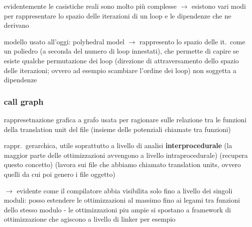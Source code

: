 evidentemente le casistiche reali sono molto pi\`u complesse $\rightarrow$ esistono vari modi per rappresentare lo spazio delle iterazioni di un loop e le dipendenze che ne derivano

modello usato all'oggi: polyhedral model $\rightarrow$ rappresento lo spazio delle it.~come un poliedro (a seconda del numero di loop innestati), che permette di capire se esiste qualche permutazione dei loop (direzione di attraversamento dello spazio delle iterazioni; ovvero ad esempio scambiare l'ordine dei loop) non soggetta a dipendenze

\subsubsection{call graph}

rappresetnazione grafica a grafo usata per ragionare sulle relazione tra le funzioni della translation unit del file (insieme delle potenziali chiamate tra funzioni)

rappr.~gerarchica, utile soprattutto a livello di analisi \textbf{interprocedurale} (la maggior parte delle ottimizzazioni avvengono a livello intraprocedurale) (recupera questo concetto) (lavora sui file che abbiamo chiamato translation units, ovvero quelli da cui poi genero i file oggetto)

$\rightarrow$ evidente come il compilatore abbia visibilita solo fino a livello dei singoli moduli: posso estendere le ottimizzazioni al massimo fino ai legami tra funzioni dello stesso modulo - le ottimizzazioni piu ampie si spostano a framework di ottimizzazione che agiscono a livello di linker per esempio


